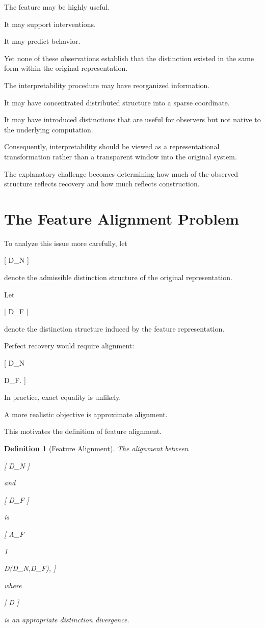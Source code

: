 \documentclass[11pt,oneside,openany]{book}
\newtheorem{definition}{Definition}[chapter] \newtheorem{theorem}{Theorem}[chapter] \newtheorem{proposition}{Proposition}[chapter] \newtheorem{lemma}{Lemma}[chapter] \newtheorem{corollary}{Corollary}[chapter] \newtheorem{remark}{Remark}[chapter]
\begin{document}
The feature may be highly useful.

It may support interventions.

It may predict behavior.

Yet none of these observations establish that the distinction existed in the same form within the original representation.

The interpretability procedure may have reorganized information.

It may have concentrated distributed structure into a sparse coordinate.

It may have introduced distinctions that are useful for observers but not native to the underlying computation.

Consequently, interpretability should be viewed as a representational transformation rather than a transparent window into the original system.

The explanatory challenge becomes determining how much of the observed structure reflects recovery and how much reflects construction.

\section{The Feature Alignment Problem}

To analyze this issue more carefully, let

[
D_N
]

denote the admissible distinction structure of the original representation.

Let

[
D_F
]

denote the distinction structure induced by the feature representation.

Perfect recovery would require alignment:

[
D_N

D_F.
]

In practice, exact equality is unlikely.

A more realistic objective is approximate alignment.

This motivates the definition of feature alignment.

\begin{definition}[Feature Alignment]

The alignment between

[
D_N
]

and

[
D_F
]

is

[
A_F

1

D(D_N,D_F),
]

where

[
D
]

is an appropriate distinction divergence.

\end{definition}
\end{document}
